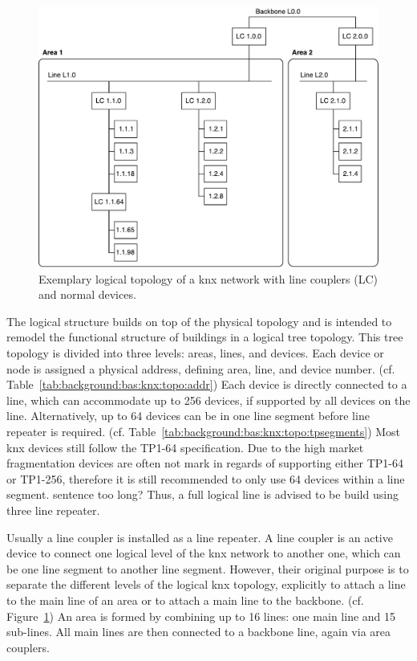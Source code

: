 \begin{figure}
	\centering
	\includegraphics[width=\textwidth]{figures/100-knx-demo-topo.pdf}
	\caption[KNX network topology]{Exemplary logical topology of a \gls{knx} network with line couplers (LC) and normal devices.}
	\label{fig:background:knx:topo}
\end{figure}

The logical structure builds on top of the physical topology and is intended to remodel the functional structure of buildings in a logical tree topology. This tree topology is divided into three levels: areas, lines, and devices. Each device or node is assigned a physical address, defining area, line, and device number. (cf. Table~\ref{tab:background:bas:knx:topo:addr})
Each device is directly connected to a line, which can accommodate up to 256 devices, if supported by all devices on the line. Alternatively, up to 64 devices can be in one line segment before line repeater is required. (cf. Table~\ref{tab:background:bas:knx:topo:tpsegments})
Most \gls{knx} devices still follow the TP1-64 specification. Due to the high market fragmentation devices are often not mark in regards of supporting either TP1-64 or TP1-256, therefore it is still recommended to only use 64 devices within a line segment. \alert{sentence too long?} Thus, a full logical line is advised to be build using three line repeater. \parencite{Sokollik2017,Merz2009}

Usually a line coupler is installed as a line repeater. A line coupler is an active device to connect one logical level of the \gls{knx} network to another one, which can be one line segment to another line segment.
However, their original purpose is to separate the different levels of the logical \gls{knx} topology, explicitly to attach a line to the main line of an area or to attach a main line to the backbone. (cf. Figure~\ref{fig:background:knx:topo})
An area is formed by combining up to 16 lines: one main line and 15 sub-lines. All main lines are then connected to a backbone line, again via area couplers. \parencite{Sokollik2017}

